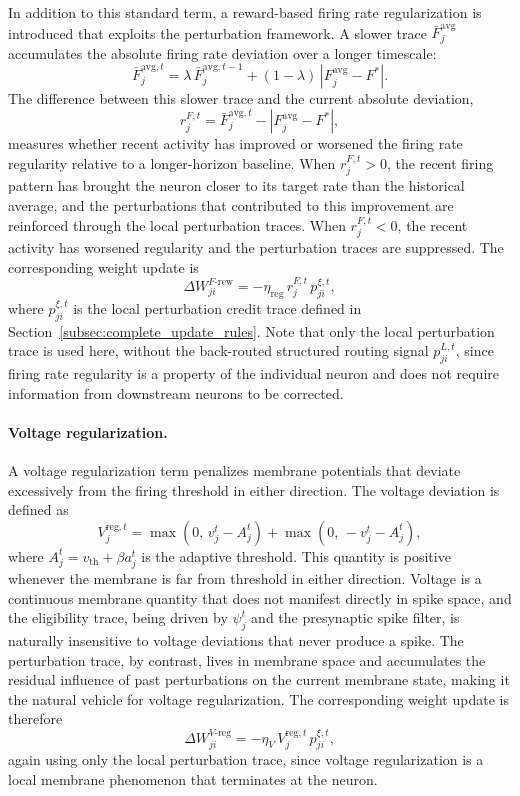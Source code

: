     In addition to this standard term, a reward-based firing rate regularization is
    introduced that exploits the perturbation framework. A slower trace
    $\bar{F}_j^{\mathrm{avg}}$ accumulates the absolute firing rate deviation over a
    longer timescale:
    \[
        \bar{F}_j^{\mathrm{avg},t} = \lambda\, \bar{F}_j^{\mathrm{avg},t-1}
        + (1 - \lambda)\, |F_j^{\mathrm{avg}} - F^*|.
    \]
    The difference between this slower trace and the current absolute deviation,
    \[
        r_j^{F,t} = \bar{F}_j^{\mathrm{avg},t} - |F_j^{\mathrm{avg}} - F^*|,
    \]
    measures whether recent activity has improved or worsened the firing rate regularity
    relative to a longer-horizon baseline. When $r_j^{F,t} > 0$, the recent firing
    pattern has brought the neuron closer to its target rate than the historical average,
    and the perturbations that contributed to this improvement are reinforced through the
    local perturbation traces. When $r_j^{F,t} < 0$, the recent activity has worsened
    regularity and the perturbation traces are suppressed. The corresponding weight update
    is
    \[
        \Delta W_{ji}^{F\text{-rew}} = -\eta_{\mathrm{reg}}\,
        r_j^{F,t}\, p_{ji}^{\xi,t},
    \]
    where $p_{ji}^{\xi,t}$ is the local perturbation credit trace defined in
    Section~\ref{subsec:complete_update_rules}. Note that only the local perturbation
    trace is used here, without the back-routed structured routing signal $p_{ji}^{L,t}$,
    since firing rate regularity is a property of the individual neuron and does not
    require information from downstream neurons to be corrected.
    
    \paragraph{Voltage regularization.}
    
    A voltage regularization term penalizes membrane potentials that deviate excessively
    from the firing threshold in either direction. The voltage deviation is defined as
    \[
        V_j^{\mathrm{reg},t} =
        \max(0,\, v_j^t - A_j^t)
        + \max(0,\, -v_j^t - A_j^t),
    \]
    where $A_j^t = v_{\mathrm{th}} + \beta a_j^t$ is the adaptive threshold. This quantity
    is positive whenever the membrane is far from threshold in either direction. Voltage
    is a continuous membrane quantity that does not manifest directly in spike space, and
    the eligibility trace, being driven by $\psi_j^t$ and the presynaptic spike filter, is
    naturally insensitive to voltage deviations that never produce a spike. The perturbation
    trace, by contrast, lives in membrane space and accumulates the residual influence of
    past perturbations on the current membrane state, making it the natural vehicle for
    voltage regularization. The corresponding weight update is therefore
    \[
        \Delta W_{ji}^{V\text{-reg}} = -\eta_V\,
        V_j^{\mathrm{reg},t}\, p_{ji}^{\xi,t},
    \]
    again using only the local perturbation trace, since
    voltage regularization is a local membrane phenomenon that terminates at the neuron.
    
